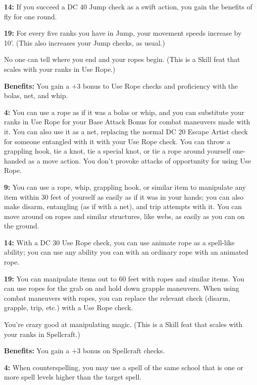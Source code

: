 \textbf{14:} If you succeed a DC 40 Jump check as a swift action, you gain the benefits of fly for one round.

\textbf{19:} For every five ranks you have in Jump, your movement speeds increase by 10'. (This also increases your Jump checks, as usual.)


No one can tell where you end and your ropes begin. (This is a Skill feat that scales with your ranks in Use Rope.)

\textbf{Benefits:} You gain a +3 bonus to Use Rope checks and proficiency with the bolas, net, and whip.

\textbf{4:} You can use a rope as if it was a bolas or whip, and you can substitute your ranks in Use Rope for your Base Attack Bonus for combat maneuvers made with it. You can also use it as a net, replacing the normal DC 20 Escape Artist check for someone entangled with it with your Use Rope check. You can throw a grappling hook, tie a knot, tie a special knot, or tie a rope around yourself one-handed as a move action. You don't provoke attacks of opportunity for using Use Rope.

\textbf{9:} You can use a rope, whip, grappling hook, or similar item to manipulate any item within 30 feet of yourself as easily as if it was in your hands; you can also make disarm, entangling (as if with a net), and trip attempts with it. You can move around on ropes and similar structures, like webs, as easily as you can on the ground.

\textbf{14:} With a DC 30 Use Rope check, you can use animate rope as a spell-like ability; you can use any ability you can with an ordinary rope with an animated rope.

\textbf{19:} You can manipulate items out to 60 feet with ropes and similar items. You can use ropes for the grab on and hold down grapple maneuvers. When using combat maneuvers with ropes, you can replace the relevant check (disarm, grapple, trip, etc.) with a Use Rope check.


You're crazy good at manipulating magic. (This is a Skill feat that scales with your ranks in Spellcraft.)

\textbf{Benefits:} You gain a +3 bonus on Spellcraft checks.

\textbf{4:} When counterspelling, you may use a spell of the same school that is one or more spell levels higher than the target spell.

